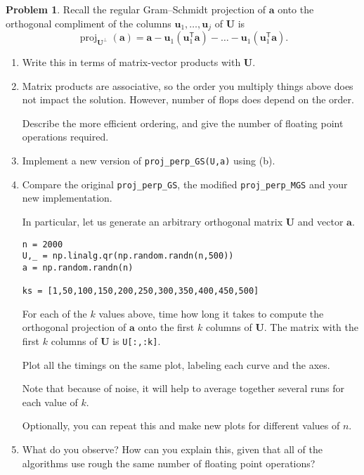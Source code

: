 \documentclass[12pt]{article}
\theoremstyle{definition}
\newtheorem{problem}{Problem}
\renewcommand{\vec}{\mathbf}
\newcommand{\T}{\mathsf{T}}
\begin{document}
\begin{problem}
    Recall the regular Gram--Schmidt projection of $\vec{a}$ onto the orthogonal compliment of the columns $\vec{u}_1, \ldots, \vec{u}_j$ of $\vec{U}$ is
    \[
        \operatorname{proj}_{\vec{U}^\perp}(\vec{a}) = \vec{a} - \vec{u}_1 (\vec{u}_1^\T \vec{a}) - \ldots - \vec{u}_1 (\vec{u}_1^\T \vec{a}).
    \]
    \begin{enumerate}
        \item Write this in terms of matrix-vector products with $\vec{U}$.
        \item Matrix products are associative, so the order you multiply things above does not impact the solution. 
            However, number of flops does depend on the order.

            Describe the more efficient ordering, and give the number of floating point operations required.

        \item Implement a new version of \lstinline{proj_perp_GS(U,a)} using (b).

        \item Compare the original \lstinline{proj_perp_GS}, the modified \lstinline{proj_perp_MGS} and your new implementation.

            In particular, let us generate an arbitrary orthogonal matrix $\vec{U}$ and vector $\vec{a}$.
\begin{lstlisting}
n = 2000
U,_ = np.linalg.qr(np.random.randn(n,500))
a = np.random.randn(n)

ks = [1,50,100,150,200,250,300,350,400,450,500]
\end{lstlisting}

            For each of the $k$ values above, time how long it takes to compute the orthogonal projection of $\vec{a}$ onto the first $k$ columns of $\vec{U}$.
            The matrix with the first $k$ columns of $\vec{U}$ is \lstinline{U[:,:k]}.

            Plot all the timings on the same plot, labeling each curve and the axes.

            Note that because of noise, it will help to average together several runs for each value of $k$. 

            Optionally, you can repeat this and make new plots for different values of $n$.

        \item What do you observe? How can you explain this, given that all of the algorithms use rough the same number of floating point operations?


    \end{enumerate}
\end{problem}
\end{document}
